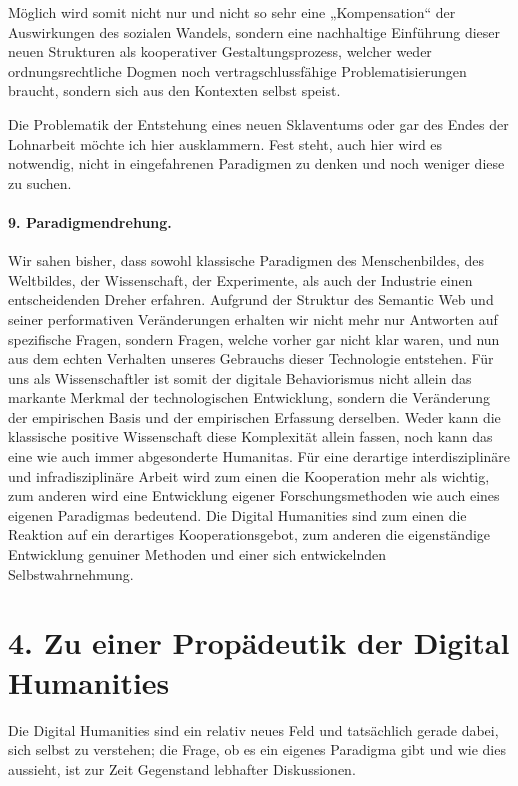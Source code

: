 \documentclass[12pt,a4paper]{article}
\begin{document}
Möglich wird somit nicht nur und nicht so sehr eine „Kompensation“ der
Auswirkungen des sozialen Wandels, sondern eine nachhaltige Einführung dieser
neuen Strukturen als kooperativer Gestaltungsprozess, welcher weder
ordnungsrechtliche Dogmen noch vertragschlussfähige Problematisierungen
braucht, sondern sich aus den Kontexten selbst speist.

Die Problematik der Entstehung eines neuen Sklaventums oder gar des Endes der
Lohnarbeit möchte ich hier ausklammern. Fest steht, auch hier wird es
notwendig, nicht in eingefahrenen Paradigmen zu denken und noch weniger diese
zu suchen.
\enlargethispage{1em}

\paragraph{9. Paradigmendrehung.}

Wir sahen bisher, dass sowohl klassische Paradigmen des Menschenbildes, des
Weltbildes, der Wissenschaft, der Experimente, als auch der Industrie einen
entscheidenden Dreher erfahren. Aufgrund der Struktur des Semantic Web und
seiner performativen Veränderungen erhalten wir nicht mehr nur Antworten auf
spezifische Fragen, sondern Fragen, welche vorher gar nicht klar waren, und
nun aus dem echten Verhalten unseres Gebrauchs dieser Technologie
entstehen. Für uns als Wissenschaftler ist somit der digitale Behaviorismus
nicht allein das markante Merkmal der technologischen Entwicklung, sondern die
Veränderung der empirischen Basis und der empirischen Erfassung
derselben. Weder kann die klassische positive Wissenschaft diese Komplexität
allein fassen, noch kann das eine wie auch immer abgesonderte Humanitas. Für
eine derartige interdisziplinäre und infradisziplinäre Arbeit wird zum einen
die Kooperation mehr als wichtig, zum anderen wird eine Entwicklung eigener
Forschungsmethoden wie auch eines eigenen Paradigmas bedeutend. Die Digital
Humanities sind zum einen die Reaktion auf ein derartiges Kooperationsgebot,
zum anderen die eigenständige Entwicklung genuiner Methoden und einer sich
entwickelnden Selbstwahrnehmung.

\section*{4. Zu einer Propädeutik der Digital Humanities}

Die Digital Humanities sind ein relativ neues Feld und tatsächlich gerade
dabei, sich selbst zu verstehen; die Frage, ob es ein eigenes Paradigma gibt
und wie dies aussieht, ist zur Zeit Gegenstand lebhafter Diskussionen.
\end{document}
